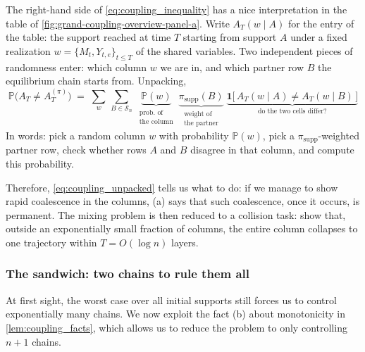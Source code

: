\documentclass[
    aps,
    superscriptaddress,
    onecolumn,
    10pt,
    prx,
    nofootinbib
]{revtex4-2}
\theoremstyle{namedstatement}
\theoremstyle{plain}
\begin{document}
The right-hand side of \cref{eq:coupling_inequality} has a nice interpretation in the table of \cref{fig:grand-coupling-overview-panel-a}. Write $A_T(w\mid A)$ for the entry of the table: the support reached at time $T$ starting from support $A$ under a fixed realization $w = \{M_t, Y_{t,e}\}_{t \le T}$ of the shared variables. Two independent pieces of randomness enter: which column $w$ we are in, and which partner row $B$ the equilibrium chain starts from. Unpacking,
\begin{equation}\label{eq:coupling_unpacked}
    \mathbb{P}\big( A_T \neq A^{(\pi)}_T \big)
    \;=\;
    \sum_{w}\,\sum_{B \in \mathcal{S}_n}\;
    \underbrace{\mathbb{P}(w)}_{\substack{\text{prob.\ of}\\ \text{the column}}}\;
    \underbrace{\pi_{\mathrm{supp}}(B)}_{\substack{\text{weight of}\\ \text{the partner}}}\;
    \underbrace{\mathbf{1}\big[\, A_T(w \mid A) \neq A_T(w \mid B) \,\big]}_{\text{do the two cells differ?}}
\end{equation}
In words: pick a random column $w$ with probability $\mathbb{P}(w)$, pick a $\pi_{\mathrm{supp}}$-weighted partner row, check whether
rows $A$ and $B$ disagree in that column, and compute this probability.


Therefore, \cref{eq:coupling_unpacked} tells us what to do: if we manage to show rapid coalescence in the columns, (a) says that such coalescence, once it occurs, is permanent. The mixing problem is then reduced to a collision task: show that, outside an exponentially small fraction of columns, the entire column collapses to one trajectory within $T = O(\log n)$ layers.



\subsubsection{The sandwich: two chains to rule them all}
At first sight, the worst case over all initial supports still forces us to control exponentially many chains. We now exploit the fact (b) about monotonicity in \cref{lem:coupling_facts}, which allows us to reduce the problem to only controlling $n+1$ chains.
\end{document}
